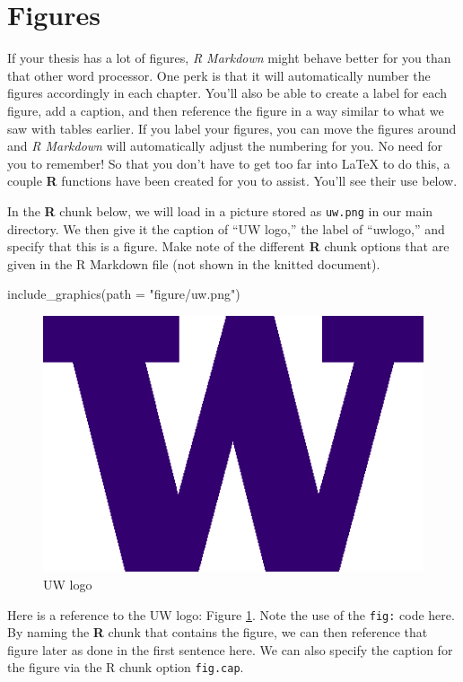 \documentclass [11pt, proquest] {uwthesis}[2015/03/03]
\newenvironment{Shaded}{\begin{snugshade}}{\end{snugshade}}
\newcommand{\AttributeTok}[1]{\textcolor[rgb]{0.77,0.63,0.00}{#1}}
\newcommand{\FunctionTok}[1]{\textcolor[rgb]{0.00,0.00,0.00}{#1}}
\newcommand{\NormalTok}[1]{#1}
\newcommand{\StringTok}[1]{\textcolor[rgb]{0.31,0.60,0.02}{#1}}
\begin{document}
\clearpage

\hypertarget{figures}{%
\section{Figures}\label{figures}}

If your thesis has a lot of figures, \emph{R Markdown} might behave better for you than that other word processor. One perk is that it will automatically number the figures accordingly in each chapter. You'll also be able to create a label for each figure, add a caption, and then reference the figure in a way similar to what we saw with tables earlier. If you label your figures, you can move the figures around and \emph{R Markdown} will automatically adjust the numbering for you. No need for you to remember! So that you don't have to get too far into LaTeX to do this, a couple \textbf{R} functions have been created for you to assist. You'll see their use below.

In the \textbf{R} chunk below, we will load in a picture stored as \texttt{uw.png} in our main directory. We then give it the caption of ``UW logo,'' the label of ``uwlogo,'' and specify that this is a figure. Make note of the different \textbf{R} chunk options that are given in the R Markdown file (not shown in the knitted document).
\begin{Shaded}
\begin{Highlighting}[]
\FunctionTok{include\_graphics}\NormalTok{(}\AttributeTok{path =} \StringTok{"figure/uw.png"}\NormalTok{)}
\end{Highlighting}
\end{Shaded}
\begin{figure}
\includegraphics[width=6.25in]{figure/uw} \caption{UW logo}\label{fig:uwlogo}
\end{figure}
Here is a reference to the UW logo: Figure \ref{fig:uwlogo}. Note the use of the \texttt{fig:} code here. By naming the \textbf{R} chunk that contains the figure, we can then reference that figure later as done in the first sentence here. We can also specify the caption for the figure via the R chunk option \texttt{fig.cap}.
\end{document}

